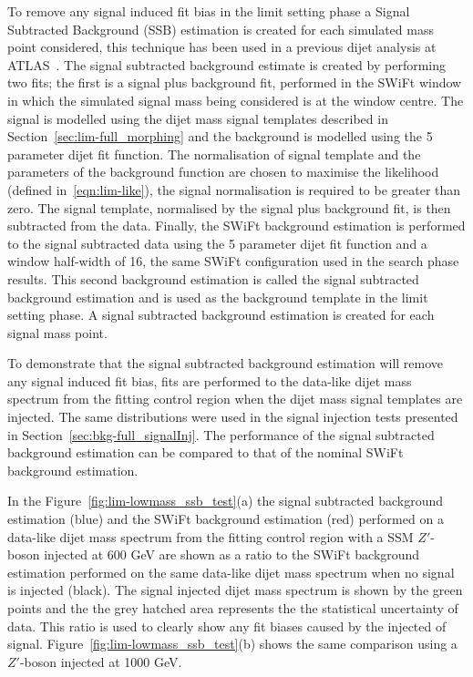 To remove any signal induced fit bias in the limit setting phase a Signal Subtracted Background (SSB) estimation is
created for each simulated mass point considered, this technique has been used in a previous dijet analysis at ATLAS~\cite{dijet-mori17_paper}.
The signal subtracted background estimate is created by performing two fits;
the first is a signal plus background fit, performed in the SWiFt window
in which the simulated signal mass being considered is at the window centre.
The signal is modelled using the dijet mass signal templates described in Section~\ref{sec:lim-full_morphing}
and the background is modelled using the 5 parameter dijet fit function.
The normalisation of signal template and the parameters of the background function are
chosen to maximise the likelihood (defined in~\ref{eqn:lim-like}),
the signal normalisation is required to be greater than zero.
The signal template, normalised by the signal plus background fit, is then subtracted from the data.
Finally, the SWiFt background estimation is performed to the signal subtracted data using the 
5 parameter dijet fit function and a window half-width of 16, the same SWiFt configuration used in the search phase results.
This second background estimation is called the signal subtracted background estimation and is used as the background template in the limit setting phase.
A signal subtracted background estimation is created for each signal mass point.

To demonstrate that the signal subtracted background estimation will remove any signal induced fit bias,
fits are performed to the data-like dijet mass spectrum from the fitting control region when the dijet mass signal templates are injected.
The same distributions were used in the signal injection tests presented in Section~\ref{sec:bkg-full_signalInj}.
The performance of the signal subtracted background estimation can be compared to that of the nominal SWiFt background estimation.

In the Figure~\ref{fig:lim-lowmass_ssb_test}(a) the signal subtracted background estimation (blue)
and the SWiFt background estimation (red) performed on a data-like dijet mass spectrum from the fitting control region with a SSM $Z'$-boson injected at 600 GeV
are shown as a ratio to the SWiFt background estimation performed on the same data-like dijet mass spectrum when no signal is injected (black).
The signal injected dijet mass spectrum is shown by the green points and the the grey hatched area represents the the statistical uncertainty of data.
This ratio is used to clearly show any fit biases caused by the injected of signal.
Figure~\ref{fig:lim-lowmass_ssb_test}(b) shows the same comparison using a $Z'$-boson injected at 1000 GeV.

